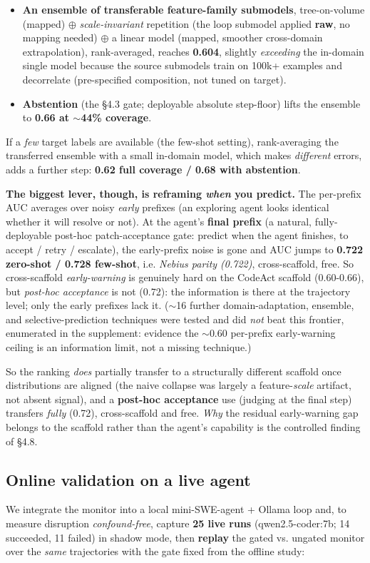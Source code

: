 \begin{itemize}
\item \textbf{An ensemble of transferable feature-family submodels}, tree-on-volume (mapped) $\oplus$ \emph{scale-invariant} repetition (the loop submodel applied \textbf{raw}, no mapping needed) $\oplus$ a linear model (mapped, smoother cross-domain extrapolation), rank-averaged, reaches \textbf{0.604}, slightly \emph{exceeding} the in-domain single model because the source submodels train on 100k+ examples and decorrelate (pre-specified composition, not tuned on target).
\item \textbf{Abstention} (the \S4.3 gate; deployable absolute step-floor) lifts the ensemble to \textbf{0.66 at $\sim$44\% coverage}.
\end{itemize}
If a \emph{few} target labels are available (the few-shot setting), rank-averaging the transferred ensemble with a small in-domain model, which makes \emph{different} errors, adds a further step: \textbf{0.62 full coverage / 0.68 with abstention}.

\textbf{The biggest lever, though, is reframing \emph{when} you predict.} The per-prefix AUC averages over noisy \emph{early} prefixes (an exploring agent looks identical whether it will resolve or not). At the agent's \textbf{final prefix} (a natural, fully-deployable post-hoc patch-acceptance gate: predict when the agent finishes, to accept / retry / escalate), the early-prefix noise is gone and AUC jumps to \textbf{0.722 zero-shot / 0.728 few-shot}, i.e. \emph{Nebius parity (0.722)}, cross-scaffold, free. So cross-scaffold \emph{early-warning} is genuinely hard on the CodeAct scaffold (0.60-0.66), but \emph{post-hoc acceptance} is not (0.72): the information is there at the trajectory level; only the early prefixes lack it. ($\sim$16 further domain-adaptation, ensemble, and selective-prediction techniques were tested and did \emph{not} beat this frontier, enumerated in the supplement: evidence the $\sim$0.60 per-prefix early-warning ceiling is an information limit, not a missing technique.)

So the ranking \emph{does} partially transfer to a structurally different scaffold once distributions are aligned (the naive collapse was largely a feature-\emph{scale} artifact, not absent signal), and a \textbf{post-hoc acceptance} use (judging at the final step) transfers \emph{fully} (0.72), cross-scaffold and free. \emph{Why} the residual early-warning gap belongs to the scaffold rather than the agent's capability is the controlled finding of \S4.8.

\subsection{Online validation on a live agent}
We integrate the monitor into a local mini-SWE-agent + Ollama loop and, to measure disruption \emph{confound-free}, capture \textbf{25 live runs} (qwen2.5-coder:7b; 14 succeeded, 11 failed) in shadow mode, then \textbf{replay} the gated vs. ungated monitor over the \emph{same} trajectories with the gate fixed from the offline study:

